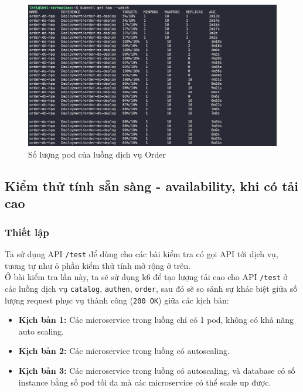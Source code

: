 \begin{figure}[H]
  \begin{center}
      \includegraphics[scale = 0.65]{images/hanh/fullflow-test/full-flow-order-with-hpa-show-hpa}
      \vspace*{1mm}
  \end{center}
  \caption{Số lượng pod của luồng dịch vụ Order}
  \label{}

\end{figure}

\subsection{Kiểm thử tính sẵn sàng - availability, khi có tải cao}
\subsubsection{Thiết lập}

\noindent Ta sử dụng API \lstinline|/test| để dùng cho các bài kiểm tra có gọi API tới dịch vụ, tương tự như ỏ phần kiểm thử tính mở rộng ở trên. \\[0.5cm]
Ở bài kiểm tra lần này, ta sẽ sử dụng k6 để tạo lượng tải cao cho API \lstinline|/test| ở các luồng dịch vụ \lstinline|catalog|, \lstinline|authen|, \lstinline|order|, sau đó sẽ so sánh sự khác biệt giữa số lượng request phục vụ thành công (\lstinline|200 OK|) giữa các kịch bản:
\begin{itemize}
  \item \textbf{Kịch bản 1:} Các microservice trong luồng chỉ có 1 pod, không có khả năng auto scaling.
  \item \textbf{Kịch bản 2:} Các microservice trong luồng có autoscaling.
  \item \textbf{Kịch bản 3:} Các microservice trong luồng có autoscaling, và database có số instance bằng số pod tối đa mà các microservice có thể scale up được.
\end{itemize}

